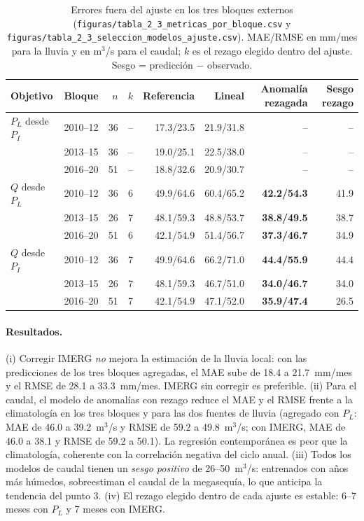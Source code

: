 \documentclass[11pt,a4paper]{article}
\newcommand{\archivo}[1]{\nolinkurl{#1}}
\newcommand{\PL}{P_L}
\newcommand{\PI}{P_I}
\newcommand{\Qm}{Q}
\begin{document}
\begin{table}[H]
\centering\small
\caption{Errores fuera del ajuste en los tres bloques externos (\archivo{figuras/tabla_2_3_metricas_por_bloque.csv} y \archivo{figuras/tabla_2_3_seleccion_modelos_ajuste.csv}). MAE/RMSE en mm/mes para la lluvia y en m$^3$/s para el caudal; $k$ es el rezago elegido dentro del ajuste. Sesgo = predicción $-$ observado.}
\label{tab:bloques}
\begin{tabular}{llrrrrrr}
\toprule
Objetivo & Bloque & $n$ & $k$ & Referencia & Lineal & Anomalía rezagada & Sesgo rezago \\
\midrule
$\PL$ desde $\PI$ & 2010--12 & 36 & -- & 17.3/23.5 & 21.9/31.8 & -- & -- \\
 & 2013--15 & 36 & -- & 19.0/25.1 & 22.5/38.0 & -- & -- \\
 & 2016--20 & 51 & -- & 18.8/32.6 & 20.9/30.7 & -- & -- \\
$\Qm$ desde $\PL$ & 2010--12 & 36 & 6 & 49.9/64.6 & 60.4/65.2 & \textbf{42.2/54.3} & 41.9 \\
 & 2013--15 & 26 & 7 & 48.1/59.3 & 48.8/53.7 & \textbf{38.8/49.5} & 38.7 \\
 & 2016--20 & 51 & 6 & 42.1/54.9 & 51.4/56.7 & \textbf{37.3/46.7} & 34.9 \\
$\Qm$ desde $\PI$ & 2010--12 & 36 & 7 & 49.9/64.6 & 66.2/71.0 & \textbf{44.4/55.9} & 44.4 \\
 & 2013--15 & 26 & 7 & 48.1/59.3 & 46.7/51.0 & \textbf{34.0/46.7} & 34.0 \\
 & 2016--20 & 51 & 7 & 42.1/54.9 & 47.1/52.0 & \textbf{35.9/47.4} & 26.5 \\
\bottomrule
\end{tabular}
\end{table}

\paragraph{Resultados.} (i) Corregir IMERG \emph{no} mejora la estimación de la lluvia local: con las predicciones de los tres bloques agregadas, el MAE sube de 18.4 a 21.7~mm/mes y el RMSE de 28.1 a 33.3~mm/mes. IMERG sin corregir es preferible. (ii) Para el caudal, el modelo de anomalías con rezago reduce el MAE y el RMSE frente a la climatología en los tres bloques y para las dos fuentes de lluvia (agregado con $\PL$: MAE de 46.0 a 39.2~m$^3$/s y RMSE de 59.2 a 49.8~m$^3$/s; con IMERG, MAE de 46.0 a 38.1 y RMSE de 59.2 a 50.1). La regresión contemporánea es peor que la climatología, coherente con la correlación negativa del ciclo anual. (iii) Todos los modelos de caudal tienen un \emph{sesgo positivo} de 26--50~m$^3$/s: entrenados con años más húmedos, sobreestiman el caudal de la megasequía, lo que anticipa la tendencia del punto 3. (iv) El rezago elegido dentro de cada ajuste es estable: 6--7 meses con $\PL$ y 7 meses con IMERG.
\end{document}
